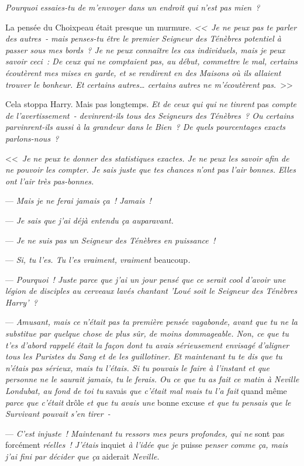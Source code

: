 \emph{Pourquoi essaies-tu de m'envoyer dans un endroit qui n'est pas mien~?}

La pensée du Choixpeau était presque un murmure. \emph{<<~Je ne peux pas te parler des autres~- mais penses-tu être le premier Seigneur des Ténèbres potentiel à passer sous mes bords~? Je ne peux connaître les cas individuels, mais je peux savoir ceci~: De ceux qui ne comptaient pas, au début, commettre le mal, certains écoutèrent mes mises en garde, et se rendirent en des Maisons où ils allaient trouver le bonheur. Et certains autres… certains autres ne m'écoutèrent pas.}~>>

Cela stoppa Harry. Mais pas longtemps. \emph{Et de ceux qui qui ne tinrent} pas \emph{compte de l'avertissement~- devinrent-ils tous des Seigneurs des Ténèbres~? Ou certains parvinrent-ils aussi à la grandeur dans le Bien~? De quels pourcentages exacts parlons-nous~?}

<<~\emph{Je ne peux te donner des statistiques exactes. Je ne peux les savoir afin de ne pouvoir les compter. Je sais juste que tes chances n'ont pas l'air bonnes. Elles ont l'air très pas-bonnes.}

--- \emph{Mais je ne ferai jamais ça~! Jamais~!}

--- \emph{Je sais que j'ai déjà entendu ça auparavant.}

--- \emph{Je ne suis pas un Seigneur des Ténèbres en puissance~!}

--- \emph{Si, tu l'es. Tu l'es vraiment, vraiment} beaucoup\emph{.}

--- \emph{Pourquoi~! Juste parce que j'ai un jour pensé que ce serait cool d'avoir une légion de disciples au cerveaux lavés chantant 'Loué soit le Seigneur des Ténèbres Harry'~?}

--- \emph{Amusant, mais ce n'était pas ta première pensée vagabonde, avant que tu ne la substitue par quelque chose de plus sûr, de moins dommageable. Non, ce que tu t'es d'abord rappelé était la façon dont tu avais sérieusement envisagé d'aligner tous les Puristes du Sang et de les guillotiner. Et maintenant tu te dis que tu n'étais pas sérieux, mais tu l'étais. Si tu pouvais le faire à l'instant et que personne ne le saurait jamais, tu le ferais. Ou ce que tu as fait ce matin à Neville Londubat, au fond de toi tu} savais \emph{que c'était mal mais tu l'a fait} quand même \emph{parce que c'était} drôle \emph{et que tu avais une} bonne excuse \emph{et que tu pensais que le Survivant pouvait s'en tirer~-}

--- \emph{C'est injuste~! Maintenant tu ressors mes peurs profondes, qui ne} sont pas forcément \emph{réelles~! J'étais} inquiet \emph{à l'idée que je} puisse \emph{penser comme ça, mais j'ai fini par décider que ça} aiderait \emph{Neville.}

